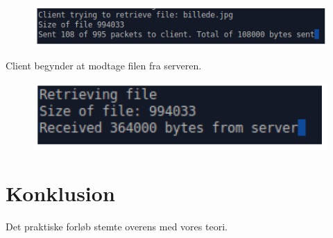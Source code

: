 \begin{figure}[h]
	\centering
	\includegraphics[width=0.7\linewidth]{figs/test3}
	\caption{}
	\label{fig:test3}
\end{figure}

Client begynder at modtage filen fra serveren.

\begin{figure}[h]
	\centering
	\includegraphics[width=0.7\linewidth]{figs/test4}
	\caption{}
	\label{fig:test4}
\end{figure}

\section{Konklusion}
Det praktiske forløb stemte overens med vores teori.